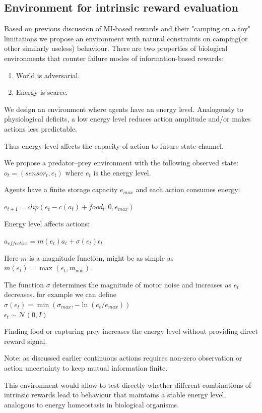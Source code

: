 \subsection{Environment for intrinsic reward evaluation}
Based on previous discussion of MI-based rewards and their "camping on a toy" limitations we propose an environment with natural constraints on camping(or other similarly useless) behaviour. There are two properties of biological environments that counter failure modes of information-based rewards:

\begin{enumerate}
  \item World is adversarial.
  \item Energy is scarce.
\end{enumerate}

We design an environment where agents have an energy level. Analogously to physiological deficits, a low energy level reduces action amplitude and/or makes actions less predictable.

Thus energy level affects the capacity of action to future state channel.

We propose a predator--prey environment with the following observed state:\\
$o_t = (sensor_t, e_t)$ 
where $e_t$ is the energy level.

Agents have a finite storage capacity $e_{max}$ and each action consumes energy:

$e_{t+1} = clip(e_t - c(a_t) + food_t, 0, e_{max})$

Energy level affects actions:

$a_{effective} = m(e_t) a_t + \sigma(e_t) \epsilon_t$

Here $m$ is a magnitude function, might be as simple as $m(e_t)=\max(e_t,m_{\min})$.

The function $\sigma$  determines the magnitude of motor noise and increases as $e_t$ decreases. for example we can define\\
$\sigma(e_t) = \min(\sigma_{max}, - \ln(e_t / e_{max}))$ \\
$\epsilon_t \sim \mathcal{N}(0, I)$

Finding food or capturing prey increases the energy level without providing direct reward signal. 

Note: as discussed earlier continuous actions requires non-zero observation or action uncertainty to keep mutual information finite.

This environment would allow to test directly whether different combinations of intrinsic rewards lead to behaviour that maintains a stable energy level, analogous to energy homeostasis in biological organisms.

